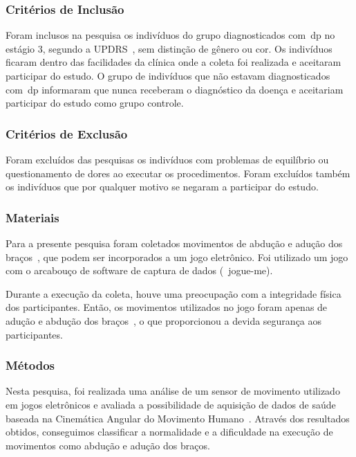 \subsubsection{Critérios de Inclusão}
Foram inclusos na pesquisa os indivíduos do grupo diagnosticados com~\ac{dp} no estágio 3, segundo a UPDRS~\cite{updrs87}, sem distinção de gênero ou cor. Os indivíduos ficaram dentro das facilidades da clínica onde a coleta foi realizada e aceitaram participar do estudo. O grupo de indivíduos que não estavam diagnosticados com~\ac{dp} informaram que nunca receberam o diagnóstico da doença e aceitariam participar do estudo como grupo controle.

\subsubsection{Critérios de Exclusão}
Foram excluídos das pesquisas os indivíduos com problemas de equilíbrio ou questionamento de dores ao executar os procedimentos. Foram excluídos também os indivíduos que por qualquer motivo se negaram a participar do estudo.

\subsubsection{Materiais}
Para a presente pesquisa foram coletados movimentos de abdução e adução dos braços~\cite{mcginnis2013biomechanics}, que podem ser incorporados a um jogo eletrônico. Foi utilizado um jogo com o arcabouço de software de captura de dados (~\ac{jogue-me}). 

Durante a execução da coleta, houve uma preocupação com a integridade física dos participantes. Então, os movimentos utilizados no jogo foram apenas de adução e abdução dos braços~\cite{mcginnis2013biomechanics}, o que proporcionou a devida segurança aos participantes. 



\subsubsection{Métodos}
Nesta pesquisa, foi realizada uma análise de um sensor de movimento utilizado em jogos eletrônicos e avaliada a possibilidade de aquisição de dados de saúde baseada na Cinemática Angular do Movimento Humano~\cite{hamill1999bases}.  Através dos resultados obtidos, conseguimos classificar a normalidade e a dificuldade na execução de movimentos como abdução e adução dos braços.

